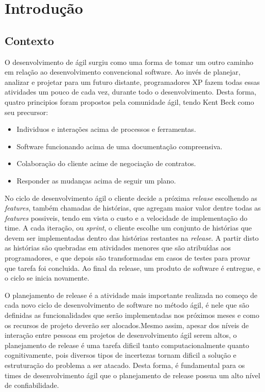 \chapter{Introdução}
\section{Contexto}
O desenvolvimento de ágil surgiu como uma forma de tomar um outro
caminho em relação ao desenvolvimento convencional software. Ao invés de planejar,
analizar e projetar para um futuro distante, programadores XP fazem todas essas
atividades um pouco de cada vez, durante todo o desenvolvimento\cite{XP}.
Desta forma, quatro principios foram propostos pela comunidade ágil, tendo Kent
Beck como seu precursor\cite{beckManifesto}:
\begin{itemize}
    \item Individuos e interações acima de processos e ferramentas.
    \item Software funcionando acima de uma documentação compreensiva.
    \item Colaboração do cliente acime de negociação de contratos.
    \item Responder as mudanças acima de seguir um plano.
\end{itemize}

No ciclo de desenvolvimento ágil o cliente decide a próxima \textit{release}
escolhendo as \textit{features}, também chamadas de histórias, que agregam
maior valor dentre todas as \textit{features} possiveis, tendo em vista  o custo
e a velocidade de implementação do time. A cada iteração, ou \textit{sprint}, o
cliente escolhe um conjunto de  histórias que devem ser implementadas dentro das 
histórias restantes na \textit{release}. A partir disto as histórias são quebradas em
atividades menores que são atribuídas aos programadores, e que depois são 
transformadas em casos de testes para provar que tarefa foi concluida\cite{XP}.
Ao final da release, um produto de software é entregue, e o ciclo se inicia 
novamente.

O planejamento de release é a atividade mais importante realizada no começo de 
cada novo ciclo de desenvolvimento de software no método ágil, é nele que são 
definidas as funcionalidades que serão implementadas nos próximos meses e como 
os recursos de projeto deverão ser alocados.Mesmo assim, apesar dos níveis de 
interação entre pessoas em projetos de desenvolvimento ágil serem altos, 
o planejamento de  release é uma tarefa dificil tanto computacionalmente quanto 
cognitivamente, pois diversos tipos de incertezas tornam dificil a solução e 
estruturação do problema a ser atacado\cite{Ngo}. Desta forma, é fundamental para 
os times de desenvolvimento ágil que o planejamento de release possua um alto 
nível de confiabilidade\cite{McDaid}.

